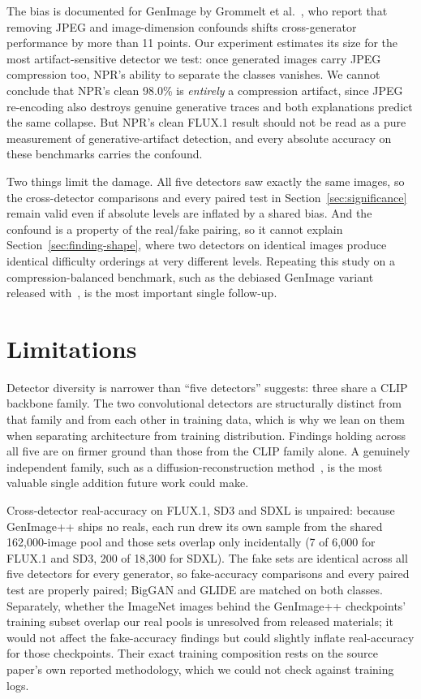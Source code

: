 \documentclass[3p,times,procedia]{elsarticle}
\begin{document}
The bias is documented for GenImage by Grommelt et
al.~\cite{grommelt2024jpeg}, who report that removing JPEG and
image-dimension confounds shifts cross-generator performance by more than
11 points. Our experiment estimates its size for the most
artifact-sensitive detector we test: once generated images carry JPEG
compression too, NPR's ability to separate the classes vanishes. We cannot
conclude that NPR's clean 98.0\% is \emph{entirely} a compression artifact,
since JPEG re-encoding also destroys genuine generative traces and both
explanations predict the same collapse. But NPR's clean FLUX.1 result
should not be read as a pure measurement of generative-artifact detection,
and every absolute accuracy on these benchmarks carries the confound.

Two things limit the damage. All five detectors saw exactly the same
images, so the cross-detector comparisons and every paired test in
Section~\ref{sec:significance} remain valid even if absolute levels are
inflated by a shared bias. And the confound is a property of the real/fake
pairing, so it cannot explain Section~\ref{sec:finding-shape}, where two
detectors on identical images produce identical difficulty orderings at
very different levels. Repeating this study on a compression-balanced
benchmark, such as the debiased GenImage variant released
with~\cite{grommelt2024jpeg}, is the most important single follow-up.

\section{Limitations}
\label{sec:limitations}

Detector diversity is narrower than ``five detectors'' suggests: three
share a CLIP backbone family. The two convolutional detectors are
structurally distinct from that family and from each other in training
data, which is why we lean on them when separating architecture from
training distribution. Findings holding across all five are on firmer
ground than those from the CLIP family alone. A genuinely independent
family, such as a diffusion-reconstruction method~\cite{wang2023dire}, is
the most valuable single addition future work could make.

Cross-detector real-accuracy on FLUX.1, SD3 and SDXL is unpaired: because
GenImage++ ships no reals, each run drew its own sample from the shared
162{,}000-image pool and those sets overlap only incidentally (7 of
6{,}000 for FLUX.1 and SD3, 200 of 18{,}300 for SDXL). The fake sets are
identical across all five detectors for every generator, so fake-accuracy
comparisons and every paired test are properly paired; BigGAN and GLIDE are
matched on both classes. Separately, whether the ImageNet images behind the
GenImage++ checkpoints' training subset overlap our real pools is
unresolved from released materials; it would not affect the fake-accuracy
findings but could slightly inflate real-accuracy for those checkpoints.
Their exact training composition rests on the source paper's own reported
methodology, which we could not check against training logs.
\end{document}
